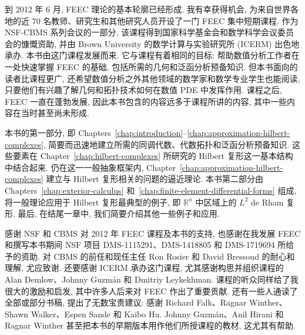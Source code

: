 {到 2012 年 6 月, FEEC 理论的基本轮廓已经形成. 我有幸获得机会, 为来自世界各地的近 70 名教师、研究生和其他研究人员开设了一门 FEEC 集中短期课程. 作为 NSF-CBMS 系列会议的一部分, 该课程得到国家科学基金会和数学科学会议委员会的慷慨资助, 并由 Brown University 的数学计算与实验研究所 (ICERM) 出色地承办. 本书由这门课程发展而来. 它与课程有着相同的目标: 帮助数值分析工作者在一处快速掌握 FEEC 的基础, 包括所需的几何和泛函分析预备知识. 但本书面向的读者比课程更广, 还希望数值分析之外其他领域的数学家和数学专业学生也能阅读, 只要他们有兴趣了解几何和拓扑技术如何在数值 PDE 中发挥作用. 课程之后, FEEC 一直在蓬勃发展, 因此本书包含的内容远多于课程所讲的内容, 其中一些内容在当时甚至尚未形成.}

{本书的第一部分, 即 Chapters~\ref{chap:introduction}--\ref{chap:approximation-hilbert-complexes}, 简要而迅速地建立所需的同调代数、代数拓扑和泛函分析预备知识. 这些要素在 Chapter~\ref{chap:hilbert-complexes} 所研究的 Hilbert 复形这一基本结构中结合起来. 仍在这一一般抽象框架内, Chapter~\ref{chap:approximation-hilbert-complexes} 建立与 Hilbert 复形相关的问题的逼近理论. 本书第二部分由 Chapters~\ref{chap:exterior-calculus} 和~\ref{chap:finite-element-differential-forms} 组成, 将一般理论应用于 Hilbert 复形最典型的例子, 即 $\mathbb R^n$ 中区域上的 $L^2$ de Rham 复形. 最后, 在结尾一章中, 我们简要介绍其他一些例子和应用.}

{感谢 NSF 和 CBMS 对 2012 年 FEEC 课程及本书的支持, 也感谢在我发展 FEEC 和撰写本书期间 NSF 项目 DMS-1115291、DMS-1418805 和 DMS-1719694 所给予的资助. 对 CBMS 的前任和现任主任 Ron Rosier 和 David Bressoud 的耐心和理解, 尤应致谢. 还要感谢 ICERM 承办这门课程, 尤其感谢构思并组织课程的 Alan Demlow、Johnny Guzmán 和 Dmitriy Leykekhman. 课程的听众同样给了我很大的激励和启发, 其中许多人后来对 FEEC 作出了重要贡献. 还有一些人通读了全部或部分书稿, 提出了无数宝贵建议: 感谢 Richard Falk、Ragnar Winther、Shawn Walker、Espen Sande 和 Kaibo Hu. Johnny Guzmán、Anil Hirani 和 Ragnar Winther 甚至把本书的早期版本用作他们所授课程的教材, 这尤其有帮助.}
